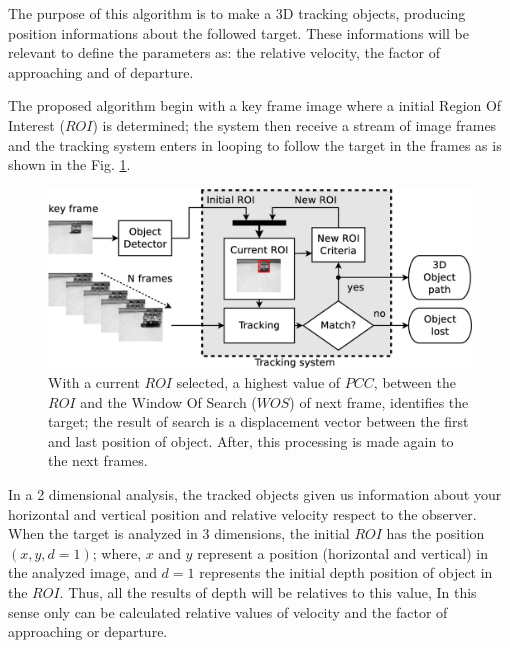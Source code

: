 The purpose of this algorithm is to make a 3D tracking objects, producing position informations 
about the followed target.
These informations will be relevant to define the parameters 
as: the relative velocity, the factor of approaching and of departure.

The proposed algorithm begin with a key frame image where a initial Region Of Interest ($ROI$) is determined; 
the system then receive a stream of image frames and the tracking system 
enters in looping to follow the target in the frames as is shown in the Fig. \ref{fig:system}.


\begin{figure}[bhp]
\includegraphics[width=\columnwidth]{images/figure1-diagram1.eps}
\caption{With a current $ROI$ selected, a highest value of $PCC$, between the $ROI$ 
and the Window Of Search ($WOS$) of next frame, identifies the target; 
the result of search is a displacement vector
between the first and last position of object. 
After, this processing is made again to the next frames.}
\label{fig:system}
\end{figure}

In a 2 dimensional analysis, the tracked objects given us information about your horizontal 
and vertical position and relative velocity respect to the observer.
When the target is analyzed in 3 dimensions, 
the initial $ROI$ has the position $(x,y,d=1)$;
where, $x$ and $y$ represent a position (horizontal and vertical) in the analyzed image,
and $d=1$ represents the initial depth position of object in the $ROI$.
Thus, all the results of depth will be relatives to this value, 
In this sense only can be calculated relative values of
velocity and the factor of approaching or departure. 

